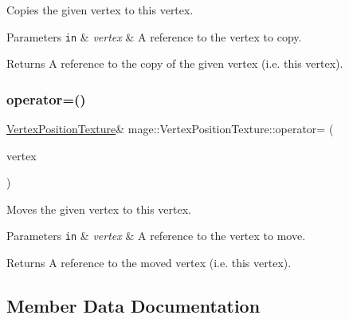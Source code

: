 Copies the given vertex to this vertex.


\begin{DoxyParams}[1]{Parameters}
\mbox{\tt in}  & {\em vertex} & A reference to the vertex to copy. \\
\hline
\end{DoxyParams}
\begin{DoxyReturn}{Returns}
A reference to the copy of the given vertex (i.\+e. this vertex). 
\end{DoxyReturn}
\hypertarget{structmage_1_1_vertex_position_texture_abced707921e05755382566dcfa876a7a}{}\label{structmage_1_1_vertex_position_texture_abced707921e05755382566dcfa876a7a} 
\subsubsection{\texorpdfstring{operator=()}{operator=()}\hspace{0.1cm}{\footnotesize\ttfamily [2/2]}}
{\footnotesize\ttfamily \hyperlink{structmage_1_1_vertex_position_texture}{Vertex\+Position\+Texture}\& mage\+::\+Vertex\+Position\+Texture\+::operator= (\begin{DoxyParamCaption}\item[{\hyperlink{structmage_1_1_vertex_position_texture}{Vertex\+Position\+Texture} \&\&}]{vertex }\end{DoxyParamCaption})\hspace{0.3cm}{\ttfamily [default]}}

Moves the given vertex to this vertex.


\begin{DoxyParams}[1]{Parameters}
\mbox{\tt in}  & {\em vertex} & A reference to the vertex to move. \\
\hline
\end{DoxyParams}
\begin{DoxyReturn}{Returns}
A reference to the moved vertex (i.\+e. this vertex). 
\end{DoxyReturn}


\subsection{Member Data Documentation}
\hypertarget{structmage_1_1_vertex_position_texture_a49253c4db52d1a4905838ba6ed6c52c6}{}\label{structmage_1_1_vertex_position_texture_a49253c4db52d1a4905838ba6ed6c52c6} 
